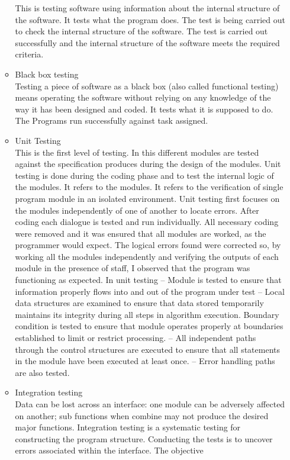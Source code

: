\documentclass[12pt]{article}
\begin{document}
\begin{enumerate}
\begin{itemize}
This is testing software using information about the internal structure of the software. It tests what the program does. The test is being carried out to check the internal structure of the software. The test is carried out successfully and the internal structure
of the software meets the required criteria.
\item Black box testing\\
Testing a piece of software as a black box (also called functional testing) means
operating the software without relying on any knowledge of the way it has been designed
and coded. It tests what it is supposed to do. The Programs run successfully against
task assigned.
\item  Unit Testing\\
This is the first level of testing. In this different modules are tested against the
specification produces during the design of the modules. Unit testing is done during
the coding phase and to test the internal logic of the modules. It refers to the modules.
It refers to the verification of single program module in an isolated environment.
Unit testing first focuses on the modules independently of one of another to locate errors.
After coding each dialogue is tested and run individually. All necessary coding were
removed and it was ensured that all modules are worked, as the programmer would
expect. The logical errors found were corrected so, by working all the modules independently and verifying the outputs of each module in the presence of staff, I observed
that the program was functioning as expected. In unit testing – Module is tested to
ensure that information properly flows into and out of the program under test – Local
data structures are examined to ensure that data stored temporarily maintains its integrity during all steps in algorithm execution. Boundary condition is tested to ensure
that module operates properly at boundaries established to limit or restrict processing.
– All independent paths through the control structures are executed to ensure that
all statements in the module have been executed at least once.
– Error handling paths are also tested.
\item Integration testing\\
Data can be lost across an interface: one module can be adversely affected on
another; sub functions when combine may not produce the desired major functions.
Integration testing is a systematic testing for constructing the program structure. Conducting the tests is to uncover errors associated within the interface. The objective

\end{itemize}
\end{enumerate}
\end{document}
